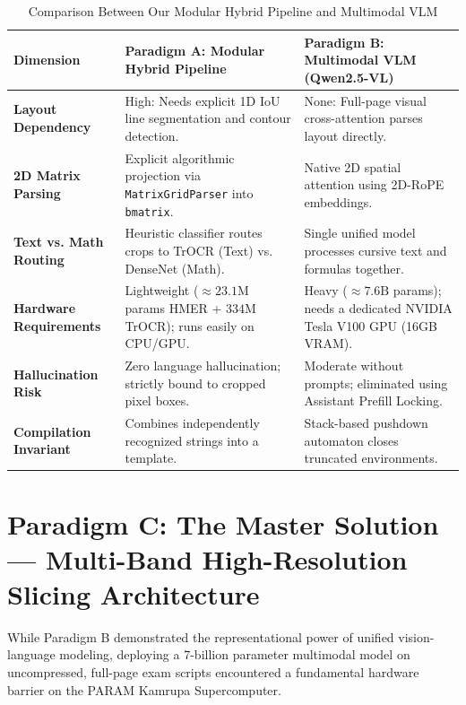 \begin{table}[htbp]
\centering
\caption{Comparison Between Our Modular Hybrid Pipeline and Multimodal VLM}
\label{tab:paradigm_comparison}
\vspace{0.2cm}
\small
\begin{tabular}{p{2.8cm}p{5.2cm}p{5.2cm}}
\toprule
\textbf{Dimension} & \textbf{Paradigm A: Modular Hybrid Pipeline} & \textbf{Paradigm B: Multimodal VLM (Qwen2.5-VL)} \\
\midrule
\textbf{Layout Dependency} & High: Needs explicit 1D IoU line segmentation and contour detection. & None: Full-page visual cross-attention parses layout directly. \\
\addlinespace
\textbf{2D Matrix Parsing} & Explicit algorithmic projection via \texttt{MatrixGridParser} into \texttt{bmatrix}. & Native 2D spatial attention using 2D-RoPE embeddings. \\
\addlinespace
\textbf{Text vs. Math Routing} & Heuristic classifier routes crops to TrOCR (Text) vs. DenseNet (Math). & Single unified model processes cursive text and formulas together. \\
\addlinespace
\textbf{Hardware Requirements} & Lightweight ($\approx 23.1\text{M}$ params HMER + $334\text{M}$ TrOCR); runs easily on CPU/GPU. & Heavy ($\approx 7.6\text{B}$ params); needs a dedicated NVIDIA Tesla V100 GPU (16GB VRAM). \\
\addlinespace
\textbf{Hallucination Risk} & Zero language hallucination; strictly bound to cropped pixel boxes. & Moderate without prompts; eliminated using Assistant Prefill Locking. \\
\addlinespace
\textbf{Compilation Invariant} & Combines independently recognized strings into a template. & Stack-based pushdown automaton closes truncated environments. \\
\bottomrule
\end{tabular}
\end{table}

\section{Paradigm C: The Master Solution --- Multi-Band High-Resolution Slicing Architecture}
\label{sec:multiband_slicing}

While Paradigm B demonstrated the representational power of unified vision-language modeling, deploying a 7-billion parameter multimodal model on uncompressed, full-page exam scripts encountered a fundamental hardware barrier on the PARAM Kamrupa Supercomputer. 

